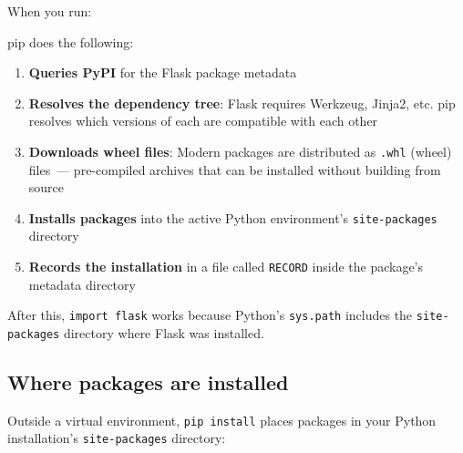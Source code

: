 When you run:

\begin{codebox}[short]

\begin{Shaded}
\begin{Highlighting}[]
\end{Highlighting}
\end{Shaded}

\end{codebox}

\noindent{}pip does the following:

\begin{enumerate}
\def\labelenumi{\arabic{enumi}.}
\tightlist
\item
  \textbf{Queries PyPI} for the Flask package metadata
\item
  \textbf{Resolves the dependency tree}: Flask requires Werkzeug, Jinja2, etc. pip resolves which versions of each are compatible with each other
\item
  \textbf{Downloads wheel files}: Modern packages are distributed as \texttt{.whl} (wheel) files~--- pre-compiled archives that can be installed without building from source
\item
  \textbf{Installs packages} into the active Python environment's \texttt{site-packages} directory
\item
  \textbf{Records the installation} in a file called \texttt{RECORD} inside the package's metadata directory
\end{enumerate}

\noindent{}After this, \texttt{import\ flask} works because Python's \texttt{sys.path} includes the \texttt{site-packages} directory where Flask was installed.

\subsection*{Where packages are installed}\label{06-local-dependencies:where-packages-are-installed}

Outside a virtual environment, \texttt{pip\ install} places packages in your Python installation's \texttt{site-packages} directory:


